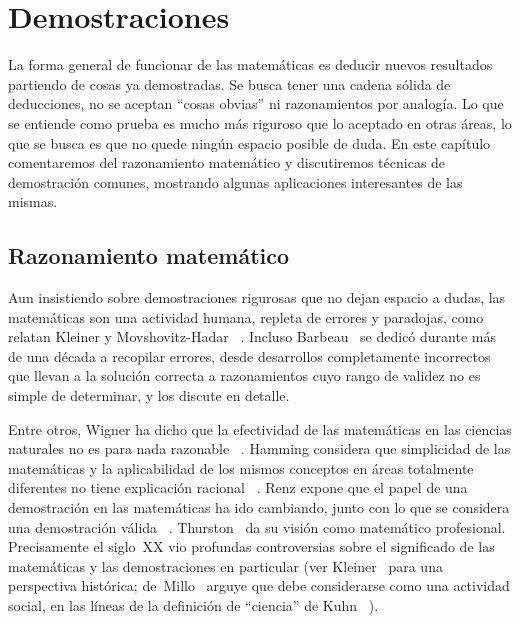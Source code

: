 %

\chapter{Demostraciones}
\label{cha:demostraciones}

  La forma general de funcionar de las matemáticas
  es deducir nuevos resultados partiendo de cosas ya demostradas.
  Se busca tener una cadena sólida de deducciones,
  no se aceptan ``cosas obvias'' ni razonamientos por analogía.
  Lo que se entiende como prueba
  es mucho más riguroso que lo aceptado en otras áreas,
  lo que se busca es que no quede ningún espacio posible de duda.
  En este capítulo comentaremos del razonamiento matemático
  y discutiremos técnicas de demostración comunes,
  mostrando algunas aplicaciones interesantes de las mismas.

\section{Razonamiento matemático}
\label{sec:razonamiento-matematico}

  Aun insistiendo sobre demostraciones rigurosas que no dejan espacio a dudas,
  las matemáticas son una actividad humana,
  repleta de errores y paradojas,
  como relatan Kleiner y Movshovitz-Hadar~%
    \cite{kleiner94:_role_paradox_evol_math}.
  Incluso Barbeau~\cite{barbeau00:_math_fallacies_flaws_flimflam}
  se dedicó durante más de una década a recopilar errores,
  desde desarrollos completamente incorrectos
  que llevan a la solución correcta
  a razonamientos cuyo rango de validez no es simple de determinar,
  y los discute en detalle.

  Entre otros,
  Wigner ha dicho que la efectividad de las matemáticas
  en las ciencias naturales
  no es para nada razonable~%
    \cite{wigner60:_unreas_effec_math_nat_sci}.
  Hamming considera que simplicidad de las matemáticas
  y la aplicabilidad de los mismos conceptos
  en áreas totalmente diferentes
  no tiene explicación racional~%
    \cite{hamming80:_unreas_effectiveness_math}.
  Renz expone que el papel de una demostración en las matemáticas
  ha ido cambiando,
  junto con lo que se considera una demostración válida~%
    \cite{renz81:_math_proof}.
  Thurston~\cite{thurston94:_proof_progr_math}
  da su visión como matemático profesional.
  Precisamente el siglo~XX vio profundas controversias
  sobre el significado de las matemáticas
  y las demostraciones en particular
  (ver Kleiner~%
     \cite{kleiner91:_rigor_proof_math}
   para una perspectiva histórica;
   de~Millo~%
     \cite{demillo79:_social_proces_proof_theor_progr}
   arguye que debe considerarse como una actividad social,
   en las líneas de la definición de ``ciencia'' de Kuhn~%
     \cite{kuhn70:_structure_science_revolutions}).

